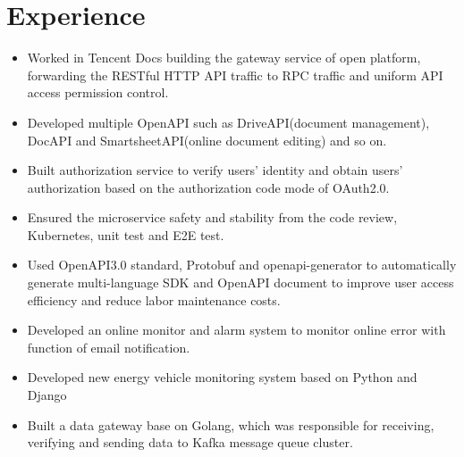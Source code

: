 \documentclass{CV}
\begin{document}
\section{Experience}
\begin{itemize}
    \item Worked in Tencent Docs building the gateway service of open platform, forwarding the RESTful HTTP API traffic to RPC traffic and uniform API access permission control.
    \item Developed multiple OpenAPI such as DriveAPI(document management), DocAPI and SmartsheetAPI(online document editing) and so on.
    \item Built authorization service to verify users' identity and obtain users' authorization based on the authorization code mode of OAuth2.0.
    \item Ensured the microservice safety and stability from the code review, Kubernetes, unit test and E2E test.
    \item Used OpenAPI3.0 standard, Protobuf and openapi-generator to automatically generate multi-language SDK and OpenAPI document to improve user access efficiency and reduce labor maintenance costs.
\end{itemize}

\begin{itemize}
    \item Developed an online monitor and alarm system to monitor online error with function of email notification.
\end{itemize}

\begin{itemize}
    \item Developed new energy vehicle monitoring system based on Python and Django
    \item Built a data gateway base on Golang, which was responsible for receiving, verifying and sending data to Kafka message queue cluster.
\end{itemize}
\end{document}
